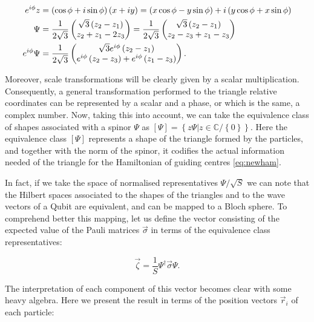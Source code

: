\begin{align*}
e^{i\phi}z &= \left( \cos{\phi}+i\sin{\phi} \right)\left( x+iy \right) = \left( x\cos{\phi}-y\sin{\phi} \right) + i\left( y\cos{\phi}+x\sin{\phi} \right)\\
\Psi &= \frac{1}{2\sqrt{3}}\begin{pmatrix}\sqrt{3}\left( z_{2}-z_{1} \right)\\
z_{2}+z_{1}-2z_{3}\end{pmatrix}=\frac{1}{2\sqrt{3}}\begin{pmatrix}\sqrt{3}\left( z_{2}-z_{1} \right)\\
z_{2}-z_3+ z_{1}-z_{3}\end{pmatrix}\\
e^{i\phi}\Psi &= \frac{1}{2\sqrt{3}}\begin{pmatrix}\sqrt{3}e^{i\phi}\left( z_{2}-z_{1} \right)\\
e^{i\phi}\left( z_{2}-z_3 \right)+ e^{i\phi}\left( z_{1}-z_{3} \right)\end{pmatrix}.
\end{align*}

Moreover, scale transformations will be clearly given by a scalar multiplication. Consequently, a general transformation performed to the triangle relative coordinates can be represented by a scalar and a phase, or which is the same, a complex number. Now, taking this into account, we can take the equivalence class of shapes associated with a spinor $\Psi$ as $\left[ \Psi \right] = \left\{ z\Psi | z \in \mathbb{C} / \left\{ 0 \right\} \right\}$. Here the equivalence class $\left[ \Psi \right]$ represents a shape of the triangle formed by the particles, and together with the norm of the spinor, it codifies the actual information needed of the triangle for the Hamiltonian of guiding centres \eqref{eq:newham}. 

In fact, if we take the space of normalised representatives $\Psi/\sqrt{S}$ we can note that the Hilbert spaces associated to the shapes of the triangles and to the wave vectors of a Qubit are equivalent, and can be mapped to a Bloch sphere. To comprehend better this mapping, let us define the vector consisting of the expected value of the Pauli matrices $\vec{\sigma}$ in terms of the equivalence class representatives:

\begin{equation}
\vec{\zeta} = \frac{1}{S} \Psi^{\dagger}\vec{\sigma}\Psi.
\end{equation}

The interpretation of each component of this vector becomes clear with some heavy algebra. Here we present the result in terms of the position vectors $ \vec{r}_i $ of each particle:

